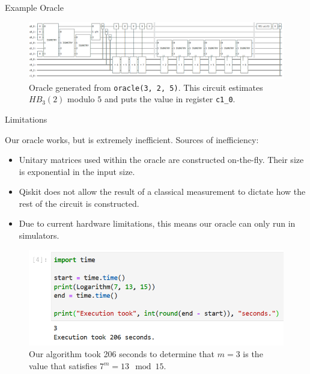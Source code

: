 \documentclass{beamer}
\begin{document}
\begin{frame}{Example Oracle}

\begin{figure}
\includegraphics[width=1\linewidth]{oracle}
\caption{Oracle generated from \texttt{oracle(3, 2, 5)}. This circuit estimates $HB_3(2)$ modulo $5$ and puts the value in register \texttt{c1\_0}.}
\end{figure}

\end{frame}


\begin{frame}{Limitations}

Our oracle works, but is extremely inefficient. Sources of inefficiency:

\begin{itemize}
    \item Unitary matrices used within the oracle are constructed on-the-fly. Their size is exponential in the input size.
    \item Qiskit does not allow the result of a classical measurement to dictate how the rest of the circuit is constructed.
    \item Due to current hardware limitations, this means our oracle can only run in simulators.
\end{itemize}

\begin{figure}
\begin{minipage}[c]{0.67\textwidth}
\includegraphics[width=\textwidth]{inefficient}
\end{minipage}\hfill
\begin{minipage}[c]{0.3\textwidth}
\caption{
Our algorithm took 206 seconds to determine that $m=3$ is the value that satisfies $7^m = 13 \mod 15$.
}
\end{minipage}
\end{figure}

\end{frame}
\end{document}
